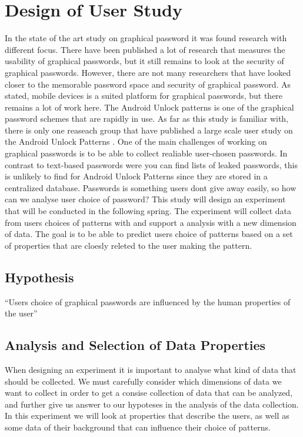 \chapter{Design of User Study}
  
  In the state of the art study on graphical password it was found research with different focus. There have been published a lot of research that measures the usability of graphical passwords, but it still remains to look at the security of graphical passwords. However, there are not many researchers that have looked closer to the memorable password space and security of graphical password. As stated, mobile devices is a suited platform for graphical passwords, but there remains a lot of work here. The Android Unlock patterns is one of the graphical password schemes that are rapidly in use. As far as this study is familiar with, there is only one reaseach group that have published a large scale user study on the Android Unlock Patterns \cite{Ullenbeck}. One of the main challenges of working on graphical passwords is to be able to collect realiable user-chosen passwords. In contrast to text-based passwords were you can find lists of leaked passwords, this is unlikely to find for Android Unlock Patterns since they are stored in a centralized database. Passwords is something users dont give away easily, so how can we analyse user choice of password?  This study will design an experiment that will be conducted in the following spring. The experiment will collect data from users choices of patterns with and support a analysis with a new dimension of data. The goal is to be able to predict users choice of patterns based on a set of properties that are cloesly releted to the user making the pattern. 

  \clearpage
  \section{Hypothesis}
  
    ``Users choice of graphical passwords are influenced by the human properties of the user''

  \section{Analysis and Selection of Data Properties}

  When designing an experiment it is important to analyse what kind of data that should be collected. We must carefully consider which dimensions of data we want to collect in order to get a consise collection of data that can be analyzed, and further give us answer to our hypoteses in the analysis of the data collection. In this experiment we will look at properties that describe the users, as well as some data of their background that can influence their choice of patterns. 


